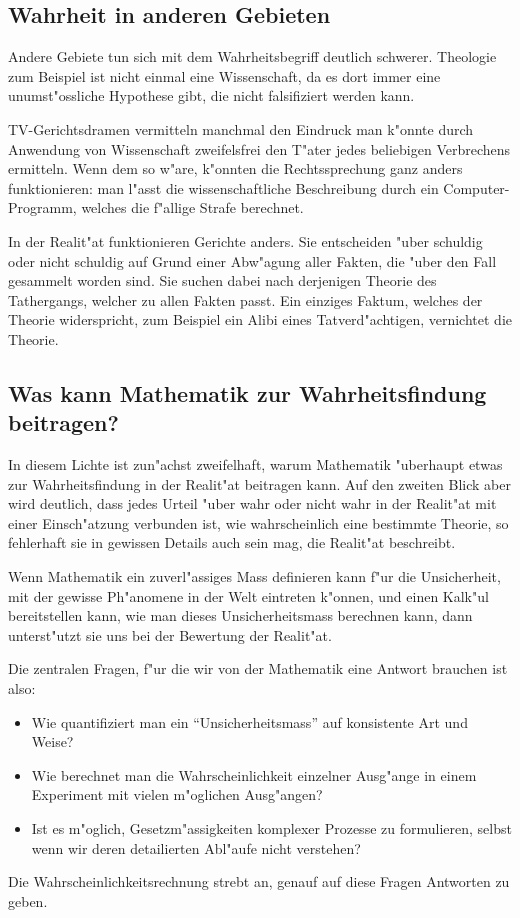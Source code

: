 \subsection*{Wahrheit in anderen Gebieten}
Andere Gebiete tun sich mit dem Wahrheitsbegriff deutlich schwerer.
Theologie zum Beispiel ist nicht einmal eine Wissenschaft, da es dort
immer eine unumst"ossliche Hypothese gibt, die nicht falsifiziert
werden kann. 

TV-Gerichtsdramen vermitteln manchmal den Eindruck man k"onnte durch
Anwendung von Wissenschaft zweifelsfrei den T"ater jedes beliebigen
Verbrechens ermitteln. Wenn dem so w"are, k"onnten die Rechtssprechung
ganz anders funktionieren: man l"asst die wissenschaftliche Beschreibung
durch ein Computer-Programm, welches die f"allige Strafe berechnet.

In der Realit"at funktionieren Gerichte anders. Sie entscheiden
"uber schuldig oder nicht schuldig auf Grund einer Abw"agung aller
Fakten, die "uber den Fall gesammelt worden sind. Sie suchen dabei nach
derjenigen Theorie des Tathergangs, welcher zu allen Fakten passt.
Ein einziges Faktum, welches der Theorie widerspricht, zum Beispiel
ein Alibi eines Tatverd"achtigen, vernichtet die Theorie.

\subsection*{Was kann Mathematik zur Wahrheitsfindung beitragen?}
In diesem Lichte ist zun"achst zweifelhaft, warum Mathematik
"uberhaupt etwas zur Wahrheitsfindung in der Realit"at beitragen
kann. Auf den zweiten Blick aber wird deutlich, dass jedes Urteil
"uber wahr oder nicht wahr in der Realit"at mit einer Einsch"atzung
verbunden ist, wie wahrscheinlich eine bestimmte Theorie, so
fehlerhaft sie in gewissen Details auch sein mag, die Realit"at beschreibt.

Wenn Mathematik ein zuverl"assiges Mass definieren kann f"ur die Unsicherheit,
mit der gewisse Ph"anomene in der Welt eintreten k"onnen, und einen
Kalk"ul bereitstellen kann, wie man dieses Unsicherheitsmass
berechnen kann, dann unterst"utzt sie uns bei der Bewertung der
Realit"at. 

Die zentralen Fragen, f"ur die wir von der Mathematik eine Antwort
brauchen ist also:
\begin{itemize}
\item Wie quantifiziert man ein ``Unsicherheitsmass'' auf konsistente
Art und Weise?
\item Wie berechnet man die Wahrscheinlichkeit einzelner Ausg"ange 
in einem Experiment mit vielen m"oglichen Ausg"angen?
\item Ist es m"oglich, Gesetzm"assigkeiten komplexer Prozesse zu
formulieren, selbst wenn wir deren detailierten Abl"aufe nicht
verstehen?
\end{itemize}
Die Wahrscheinlichkeitsrechnung strebt an, genauf auf diese Fragen
Antworten zu geben.

